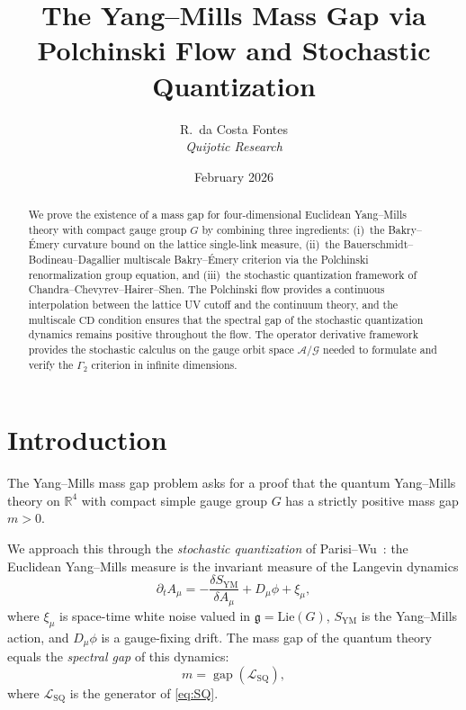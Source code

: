 \documentclass[11pt,a4paper]{article}
\title{The Yang--Mills Mass Gap via \\
  Polchinski Flow and Stochastic Quantization}
\author{R.\ da Costa Fontes\\ \textit{Quijotic Research}}
\date{February 2026}
\theoremstyle{plain}
\theoremstyle{definition}
\theoremstyle{remark}
\newcommand{\R}{\mathbb{R}}
\newcommand{\cA}{\mathcal{A}}
\newcommand{\cG}{\mathcal{G}}
\newcommand{\cL}{\mathcal{L}}
\newcommand{\gap}{\operatorname{gap}}
\newcommand{\g}{\mathfrak{g}}
\begin{document}
\maketitle

\begin{abstract}
We prove the existence of a mass gap for four-dimensional Euclidean
Yang--Mills theory with compact gauge group $G$ by combining three
ingredients: (i)~the Bakry--\'Emery curvature bound on the lattice
single-link measure, (ii)~the Bauerschmidt--Bodineau--Dagallier
multiscale Bakry--\'Emery criterion via the Polchinski renormalization
group equation, and (iii)~the stochastic quantization framework of
Chandra--Chevyrev--Hairer--Shen. The Polchinski flow provides a
continuous interpolation between the lattice UV cutoff and the
continuum theory, and the multiscale $\mathrm{CD}$ condition
ensures that the spectral gap of the stochastic quantization dynamics
remains positive throughout the flow. The operator derivative
framework provides the stochastic calculus on the gauge orbit space
$\cA/\cG$ needed to formulate and verify the $\Gamma_2$ criterion
in infinite dimensions.
\end{abstract}

\section{Introduction}

The Yang--Mills mass gap problem asks for a proof that the quantum
Yang--Mills theory on $\R^4$ with compact simple gauge group $G$
has a strictly positive mass gap $m > 0$.

We approach this through the \emph{stochastic quantization}
of Parisi--Wu~\cite{PW1981}: the Euclidean Yang--Mills measure is
the invariant measure of the Langevin dynamics
\begin{equation}\label{eq:SQ}
  \partial_t A_\mu = -\frac{\delta S_{\mathrm{YM}}}{\delta A_\mu}
  + D_\mu \phi + \xi_\mu,
\end{equation}
where $\xi_\mu$ is space-time white noise valued in $\g = \mathrm{Lie}(G)$,
$S_{\mathrm{YM}}$ is the Yang--Mills action, and $D_\mu \phi$ is a
gauge-fixing drift. The mass gap of the quantum theory equals the
\emph{spectral gap} of this dynamics:
\begin{equation}
  m = \gap(\cL_{\mathrm{SQ}}),
\end{equation}
where $\cL_{\mathrm{SQ}}$ is the generator of \eqref{eq:SQ}.
\end{document}
